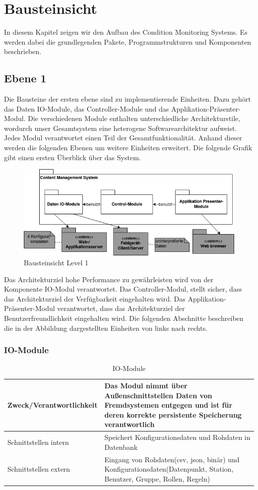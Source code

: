 \chapter{Bausteinsicht}
In diesem Kapitel zeigen wir den Aufbau des Condition Monitoring Systems. Es werden dabei die grundlegenden Pakete, Programmstrukturen und Komponenten beschrieben.
\section{Ebene 1}
Die Bausteine der ersten ebene sind zu implementierende Einheiten. Dazu gehört das Daten IO-Module, das Controller-Module und das Applikation-Präsenter-Modul. 
Die verschiedenen Module enthalten unterschiedliche Architekturstile, wordurch unser Gesamtsystem eine heterogene Softwarearchitektur aufweist. Jedes Modul verantwortet einen Teil der Gesamtfunktionalität. Anhand dieser werden die folgenden Ebenen um weitere Einheiten erweitert. Die folgende Grafik gibt einen ersten Überblick über das System.
\begin{figure}[h]
	\centering
	\includegraphics[width=1.0\textwidth]{Graphics/bausteinansicht_ebene_1.png}
	\caption{Bausteinsicht Level 1}
	\label{fig:bausteinsichtlvl1}
\end{figure}

Das Architekturziel hohe Performance zu gewährleisten wird von der Komponente IO-Modul verantwortet.
Das Controller-Modul, stellt sicher, dass das Architekturziel der Verfügbarkeit eingehalten wird. 
Das Applikation-Präsenter-Modul verantwortet, dass das Architekturziel der Benutzerfreundlichkeit eingehalten wird.
Die folgenden Abschnitte beschreiben die in der Abbildung dargestellten Einheiten von links nach rechts.  
\subsection{IO-Module}
\begin{table}
	\begin{tabularx}{\textwidth}{p{5cm} X}
		\hline
		 Zweck/Verantwortlichkeit & Das Modul nimmt über Außenschnittstellen Daten von Fremdsystemen entgegen und ist für deren korrekte persistente Speicherung verantwortlich  \\
		 \hline
		 Schnittstellen intern & Speichert Konfigurationsdaten und Rohdaten in Datenbank \\
		 \hline
		 Schnittstellen extern & Eingang von Rohdaten(csv, json, binär) und Konfigurationsdaten(Datenpunkt, Station, Benutzer, Gruppe, Rollen, Regeln) \\
		 \hline
	\end{tabularx} 
	\caption{IO-Module}
	\label{tab:IO-Module}
\end{table}


